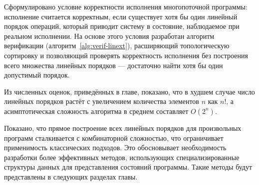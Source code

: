 Сформулировано условие корректности исполнения многопоточной
программы: исполнение считается корректным, если существует хотя бы
один линейный порядок операций, который приводит систему в состояние,
наблюдаемое при реальном исполнении. На основе этого условия
разработан алгоритм верификации (алгоритм~\ref{alg:verif-linext}),
расширяющий топологическую сортировку и позволяющий проверять
корректность исполнения без построения всего множества линейных
порядков — достаточно найти хотя бы один допустимый порядок.

Из численных оценок, приведённых в главе, показано, что в худшем
случае число линейных порядков растёт с увеличением количества
элементов $n$ как $n!$, а асимптотическая сложность алгоритма в
среднем составляет $O(2^n)$.

Показано, что прямое построение всех линейных порядков для
произвольных программ сталкивается с комбинаторной сложностью, что
ограничивает применимость классических подходов. Это обосновывает
необходимость разработки более эффективных методов, использующих
специализированные структуры данных для представления состояний
программы. Такие методы будут представлены в следующих разделах главы.

\clearpage
